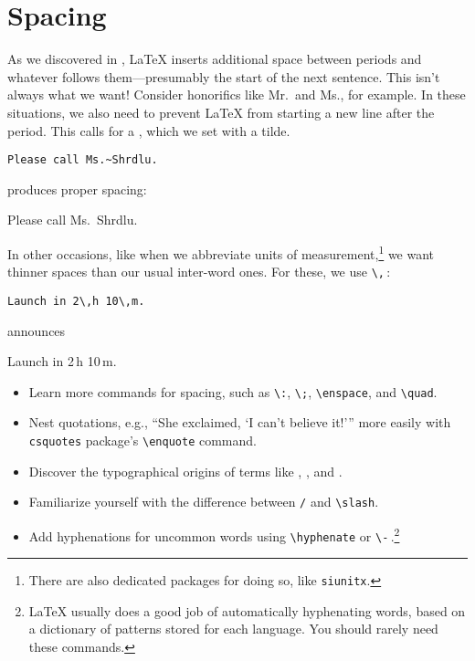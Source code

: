 \section{Spacing}

As we discovered in ,
\LaTeX{} inserts additional space between periods and whatever
follows them---presumably the start of the next sentence.
This isn't always what we want!
Consider honorifics like Mr.\ and Ms., for example.
In these situations, we also need to prevent \LaTeX{} from starting a
new line after the period.
This calls for a , which we set with a tilde.
\begin{leftfigure}
\begin{lstlisting}
Please call Ms.~Shrdlu.
\end{lstlisting}
\end{leftfigure}
produces proper spacing:
\begin{leftfigure}
\lm%
Please call Ms.~Shrdlu.
\end{leftfigure}

In other occasions, like when we abbreviate units of
measurement,\punckern\footnote{There are also dedicated packages for doing so,
like \texttt{siunitx}.}
we want thinner spaces than our usual inter-word ones.
For these, we use \verb|\,|\,:
\begin{leftfigure}
\begin{lstlisting}
Launch in 2\,h 10\,m.
\end{lstlisting}
\end{leftfigure}
announces
\begin{leftfigure}
\lm%
Launch in 2\,h 10\,m.
\end{leftfigure}

\exercises{}
\begin{itemize}
\item Learn more commands for spacing, such as \verb|\:|, \verb|\;|,
    \verb|\enspace|, and \verb|\quad|.
\item Nest quotations, e.g.,
    \enquote{She exclaimed, \enquote{I can't believe it!}}
    more easily with  \texttt{csquotes} package's \verb|\enquote| command.
\item Discover the typographical origins of terms like ,
    , and .
\item Familiarize yourself with the difference between \texttt{/} and
    \verb|\slash|.
\item Add hyphenations for uncommon words using \verb|\hyphenate|
    or \verb|\-|\,.\punckern\footnote{\LaTeX{} usually does a good
    job of automatically hyphenating words, based on a dictionary of patterns
    stored for each language. You should rarely need these commands.}
\end{itemize}
